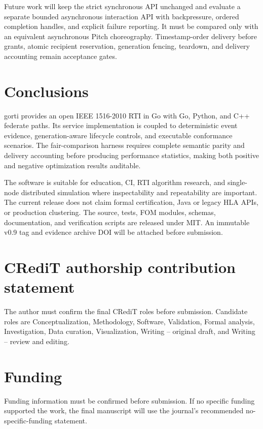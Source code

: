 \documentclass[preprint,12pt,a4paper]{elsarticle}
\begin{document}
Future work will keep the strict synchronous API unchanged and evaluate a
separate bounded asynchronous interaction API with backpressure, ordered
completion handles, and explicit failure reporting. It must be compared only
with an equivalent asynchronous Pitch choreography. Timestamp-order delivery
before grants, atomic recipient reservation, generation fencing, teardown, and
delivery accounting remain acceptance gates.

\section{Conclusions}
\label{sec:conclusions}

gorti provides an open IEEE 1516-2010 RTI in Go with Go, Python, and C++
federate paths. Its service implementation is coupled to deterministic event
evidence, generation-aware lifecycle controls, and executable conformance
scenarios. The fair-comparison harness requires complete semantic parity and
delivery accounting before producing performance statistics, making both
positive and negative optimization results auditable.

The software is suitable for education, CI, RTI algorithm research, and
single-node distributed simulation where inspectability and repeatability are
important. The current release does not claim formal certification, Java or
legacy HLA APIs, or production clustering. The source, tests, FOM modules,
schemas, documentation, and verification scripts are released under MIT. An
immutable v0.9 tag and evidence archive DOI will be attached before submission.

\section*{CRediT authorship contribution statement}

The author must confirm the final CRediT roles before submission. Candidate
roles are Conceptualization, Methodology, Software, Validation, Formal
analysis, Investigation, Data curation, Visualization, Writing -- original
draft, and Writing -- review and editing.

\section*{Funding}

Funding information must be confirmed before submission. If no specific
funding supported the work, the final manuscript will use the journal's
recommended no-specific-funding statement.
\end{document}
